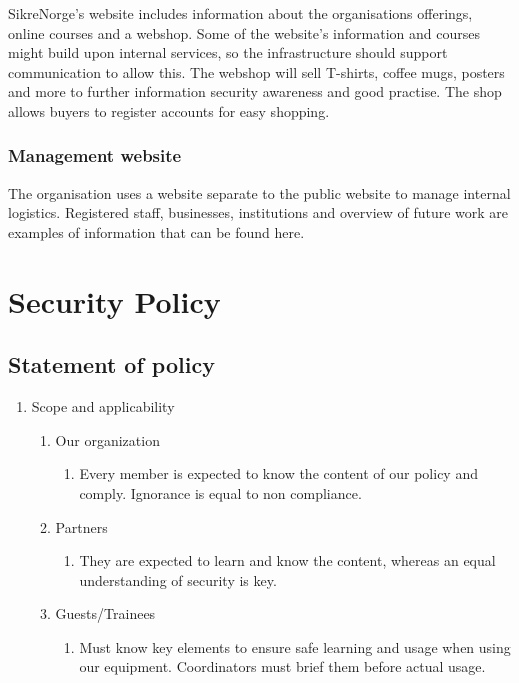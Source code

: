 SikreNorge's website includes information about the organisations offerings, online courses and a webshop. Some of the website's information and courses might build upon internal services, so the infrastructure should support communication to allow this. The webshop will sell T-shirts, coffee mugs, posters and more to further information security awareness and good practise. The shop allows buyers to register accounts for easy shopping.

\subsubsection{Management website}

The organisation uses a website separate to the public website to manage internal logistics. Registered staff, businesses, institutions and overview of future work are examples of information that can be found here.


\section{Security Policy}


\subsection{Statement of policy}

\begin{enumerate}
  \item Scope and applicability
  \begin{enumerate}
    \item Our organization
      \begin{enumerate}
        \item Every member is expected to know the content of our policy and comply. Ignorance is equal to non compliance.
      \end{enumerate}
        \item Partners
      \begin{enumerate}
        \item They are expected to learn and know the content, whereas an equal understanding of security is key.
      \end{enumerate}
        \item Guests/Trainees
      \begin{enumerate}
        \item Must know key elements to ensure safe learning and usage when using our equipment. Coordinators must brief them before actual usage.
      \end{enumerate}
  \end{enumerate}
\end{enumerate}

